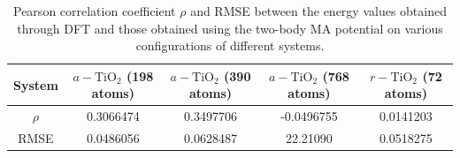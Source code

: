 \documentclass[aps,prb,twocolumn,amsmath,amssymb,superscriptaddress,longbibliography]{revtex4-1}
\newcommand\tab[1][1cm]{\hspace*{#1}} %
\begin{document}
\begin{table}[]
\begin{tabular}{c|c|c|c|c}
System & $a-\text{TiO}_2$ (198 atoms) & $a-\text{TiO}_2$ (390 atoms) & $a-\text{TiO}_2$ (768 atoms)  & $r-\text{TiO}_2$ (72 atoms) \\ \hline
$\rho$ & 0.3066474                    & 0.3497706                    & -0.0496755                   & 0.0141203                   \\
RMSE   & 0.0486056                    & 0.0628487                    & 22.21090                       & 0.0518275                   \\
\end{tabular}
\label{stats}
\caption{Pearson correlation coefficient $\rho$ and RMSE between the energy values obtained through DFT and those obtained using the two-body MA potential on various configurations of different systems.}
\end{table}

\end{document}
